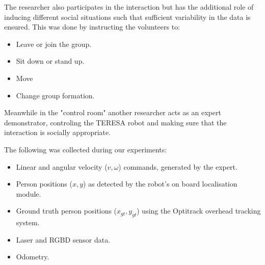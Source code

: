 \documentclass[a4paper,11pt]{report}
\begin{document}
The researcher also participates in the interaction but has the additional role of inducing different social situations such that sufficient variability in the data is ensured. This was done by instructing the volunteers to:

\begin{itemize}
 	\item Leave or join the group.
 	\item Sit down or stand up.
 	\item Move
 	\item Change group formation.
\end{itemize}
 Meanwhile in the "control room" another researcher acts as an expert demonstrator, controling the TERESA robot and making sure that the interaction is socially appropriate. 

The following was collected during our experiments:

\begin{itemize}
	\item Linear and angular velocity ($v,\omega$) commands, generated by the expert. 
	\item Person positions  ($x,y$) as detected by the robot's on board localisation module.
	\item Ground truth person positions ($x_{gt},y_{gt}$) using the Optitrack overhead tracking system.
	\item Laser and RGBD sensor data.
	\item Odometry.
\end{itemize}
\end{document}
